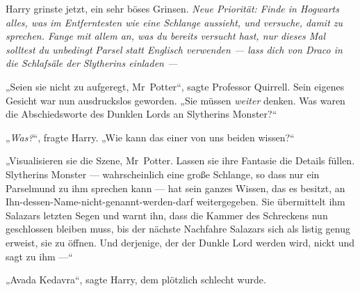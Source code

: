 Harry grinste jetzt, ein sehr böses Grinsen. \emph{Neue Priorität: Finde in Hogwarts alles, was im Entferntesten wie eine Schlange aussieht, und versuche, damit zu sprechen. Fange mit allem an, was du bereits versucht hast, nur dieses Mal solltest du unbedingt} \emph{Parsel} \emph{statt Englisch verwenden — lass dich von Draco in die Schlafsäle der Slytherins einladen —}

„Seien sie nicht zu aufgeregt, Mr~Potter“, sagte Professor Quirrell. Sein eigenes Gesicht war nun ausdruckslos geworden.
„Sie müssen \emph{weiter} denken. Was waren die Abschiedsworte des Dunklen Lords an Slytherins Monster?“

„\emph{Was?}“, fragte Harry.
„Wie kann das einer von uns beiden wissen?“

„Visualisieren sie die Szene, Mr~Potter. Lassen sie ihre Fantasie die Details füllen. Slytherins Monster — wahrscheinlich eine große Schlange, so dass nur ein Parselmund zu ihm sprechen kann — hat sein ganzes Wissen, das es besitzt, an Ihn-dessen-Name-nicht-genannt-werden-darf weitergegeben. Sie übermittelt ihm Salazars letzten Segen und warnt ihn, dass die Kammer des Schreckens nun geschlossen bleiben muss, bis der nächste Nachfahre Salazars sich als listig genug erweist, sie zu öffnen. Und derjenige, der der Dunkle Lord werden wird, nickt und sagt zu ihm —“

„Avada Kedavra“, sagte Harry, dem plötzlich schlecht wurde.

